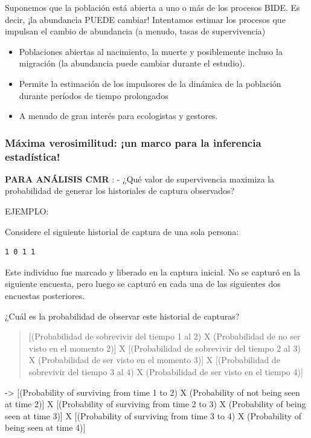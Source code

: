 \documentclass[
]{article}
\providecommand{\tightlist}{%
  \setlength{\itemsep}{0pt}\setlength{\parskip}{0pt}}
\begin{document}
Suponemos que la población está abierta a uno o más de los procesos
BIDE. Es decir, ¡la abundancia PUEDE cambiar! Intentamos estimar los
procesos que impulsan el cambio de abundancia (a menudo, tasas de
supervivencia)

\begin{itemize}
\tightlist
\item
  Poblaciones abiertas al nacimiento, la muerte y posiblemente incluso
  la migración (la abundancia puede cambiar durante el estudio).
\item
  Permite la estimación de los impulsores de la dinámica de la población
  durante períodos de tiempo prolongados
\item
  A menudo de gran interés para ecologistas y gestores.
\end{itemize}

\hypertarget{muxe1xima-verosimilitud-un-marco-para-la-inferencia-estaduxedstica}{%
\subsubsection{Máxima verosimilitud: ¡un marco para la inferencia
estadística!}\label{muxe1xima-verosimilitud-un-marco-para-la-inferencia-estaduxedstica}}

\textbf{PARA ANÁLISIS CMR }: - ¿Qué valor de supervivencia maximiza la
probabilidad de generar los historiales de captura observados?

EJEMPLO:

Considere el siguiente historial de captura de una sola persona:

\begin{verbatim}
1 0 1 1
\end{verbatim}

Este individuo fue marcado y liberado en la captura inicial. No se
capturó en la siguiente encuesta, pero luego se capturó en cada una de
las siguientes dos encuestas posteriores.

¿Cuál es la probabilidad de observar este historial de capturas?

\begin{quote}
{[}(Probabilidad de sobrevivir del tiempo 1 al 2) X (Probabilidad de no
ser visto en el momento 2){]} X {[}(Probabilidad de sobrevivir del
tiempo 2 al 3) X (Probabilidad de ser visto en el momento 3){]} X
{[}(Probabilidad de sobrevivir del tiempo 3 al 4) X (Probabilidad de ser
visto en el tiempo 4){]}
\end{quote}

-\textgreater{} {[}(Probability of surviving from time 1 to 2) X
(Probability of not being seen at time 2){]} X {[}(Probability of
surviving from time 2 to 3) X (Probability of being seen at time 3){]} X
{[}(Probability of surviving from time 3 to 4) X (Probability of being
seen at time 4){]}
\end{document}
